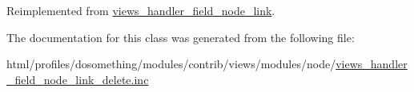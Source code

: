 Reimplemented from \hyperlink{classviews__handler__field__node__link}{views\_\-handler\_\-field\_\-node\_\-link}.

The documentation for this class was generated from the following file:\begin{DoxyCompactItemize}
\item 
html/profiles/dosomething/modules/contrib/views/modules/node/\hyperlink{views__handler__field__node__link__delete_8inc}{views\_\-handler\_\-field\_\-node\_\-link\_\-delete.inc}\end{DoxyCompactItemize}
